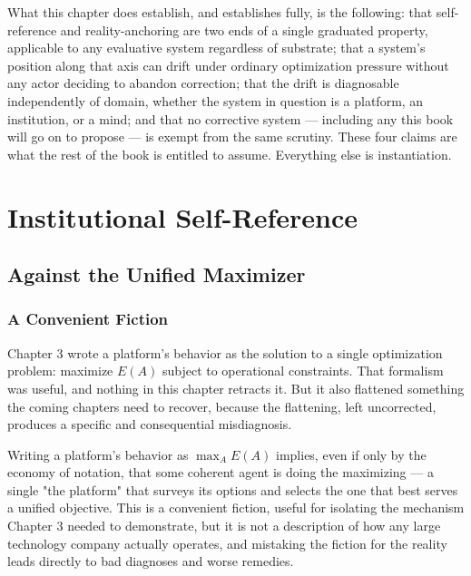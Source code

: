 \documentclass[12pt,a4paper]{book}
\begin{document}
What this chapter does establish, and establishes fully, is the following: that self-reference and reality-anchoring are two ends of a single graduated property, applicable to any evaluative system regardless of substrate; that a system's position along that axis can drift under ordinary optimization pressure without any actor deciding to abandon correction; that the drift is diagnosable independently of domain, whether the system in question is a platform, an institution, or a mind; and that no corrective system — including any this book will go on to propose — is exempt from the same scrutiny. These four claims are what the rest of the book is entitled to assume. Everything else is instantiation.



\part{Institutional Self-Reference}

\chapter{Against the Unified Maximizer}

\section{A Convenient Fiction}

Chapter 3 wrote a platform's behavior as the solution to a single optimization problem: maximize $E(A)$ subject to operational constraints. That formalism was useful, and nothing in this chapter retracts it. But it also flattened something the coming chapters need to recover, because the flattening, left uncorrected, produces a specific and consequential misdiagnosis.

Writing a platform's behavior as $\max_A E(A)$ implies, even if only by the economy of notation, that some coherent agent is doing the maximizing — a single "the platform" that surveys its options and selects the one that best serves a unified objective. This is a convenient fiction, useful for isolating the mechanism Chapter 3 needed to demonstrate, but it is not a description of how any large technology company actually operates, and mistaking the fiction for the reality leads directly to bad diagnoses and worse remedies.
\end{document}
